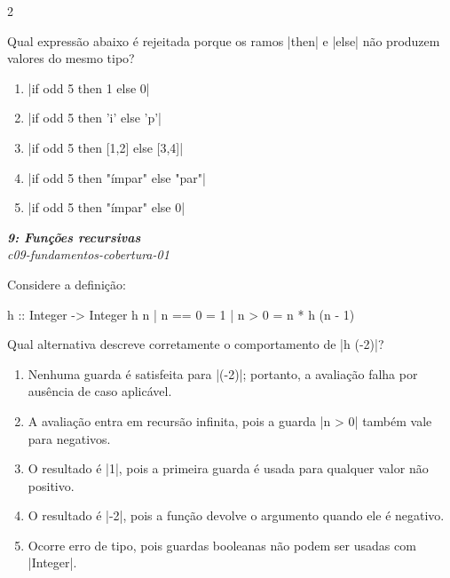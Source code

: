 \documentclass[a4paper,10pt,brazil]{article}
\begin{document}
\begin{multicols}{2}
\begin{flushright}
\end{flushright}
Qual expressão abaixo é rejeitada porque os ramos \haskellinline|then| e \haskellinline|else| não produzem valores do mesmo tipo?

\begin{enumerate}
  \item \haskellinline|if odd 5 then 1 else 0|

  \item \haskellinline|if odd 5 then 'i' else 'p'|

  \item \haskellinline|if odd 5 then [1,2] else [3,4]|

  \item \haskellinline|if odd 5 then "ímpar" else "par"|

  \item \haskellinline|if odd 5 then "ímpar" else 0|


\end{enumerate}

\begin{flushright}
  \footnotesize
  \textit{\textbf{9: Funções recursivas}}\\
  \textit{c09-fundamentos-cobertura-01}\\

\end{flushright}
Considere a definição:
\begin{haskellcode}
h :: Integer -> Integer
h n
  | n == 0 = 1
  | n > 0  = n * h (n - 1)
\end{haskellcode}
Qual alternativa descreve corretamente o comportamento de \haskellinline|h (-2)|?

\begin{enumerate}
  \item Nenhuma guarda é satisfeita para \haskellinline|(-2)|; portanto, a avaliação falha por ausência de caso aplicável.

  \item A avaliação entra em recursão infinita, pois a guarda \haskellinline|n > 0| também vale para negativos.

  \item O resultado é \haskellinline|1|, pois a primeira guarda é usada para qualquer valor não positivo.

  \item O resultado é \haskellinline|-2|, pois a função devolve o argumento quando ele é negativo.

  \item Ocorre erro de tipo, pois guardas booleanas não podem ser usadas com \haskellinline|Integer|.



\end{enumerate}
\end{multicols}
\end{document}
